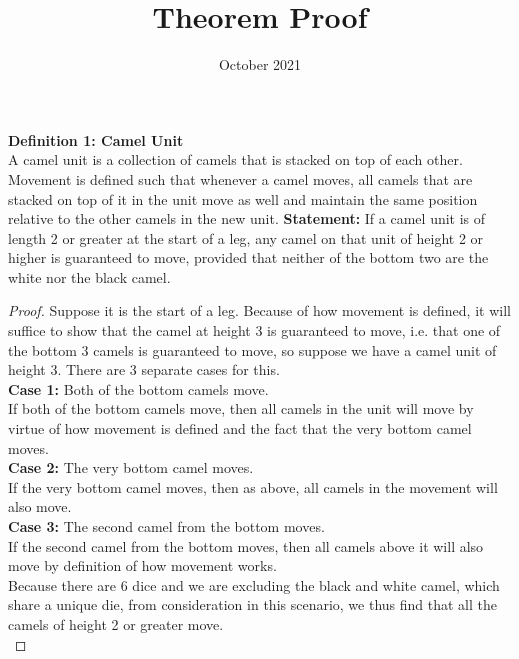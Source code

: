 \documentclass{article}
\date{October 2021}
\begin{document}
\title{Theorem Proof}
\maketitle
\textbf{Definition 1: Camel Unit}\\ 
A camel unit is a collection of camels that is stacked on top of each other. Movement is defined such that whenever a camel moves, all camels that are stacked on top of it in the unit move as well and maintain the same position relative to the other camels in the new unit.
\textbf{Statement:} If a camel unit is of length 2 or greater at the start of a leg, any camel on that unit of height 2 or higher is guaranteed to move, provided that neither of the bottom two are the white nor the black camel. \\
\begin{proof}
Suppose it is the start of a leg. Because of how movement is defined, it will suffice to show that the camel at height 3 is guaranteed to move, i.e. that one of the bottom 3 camels is guaranteed to move, so suppose we have a camel unit of height 3. There are 3 separate cases for this. \\
\textbf{Case 1:} Both of the bottom camels move. \\
If both of the bottom camels move, then all camels in the unit will move by virtue of how movement is defined and the fact that the very bottom camel moves. \\
\textbf{Case 2:} The very bottom camel moves. \\
If the very bottom camel moves, then as above, all camels in the movement will also move. \\
\textbf{Case 3:} The second camel from the bottom moves. \\
If the second camel from the bottom moves, then all camels above it will also move by definition of how movement works. \\
Because there are 6 dice and we are excluding the black and white camel, which share a unique die, from consideration in this scenario, we thus find that all the camels of height 2 or greater move. \\
\end{proof}
\end{document}

